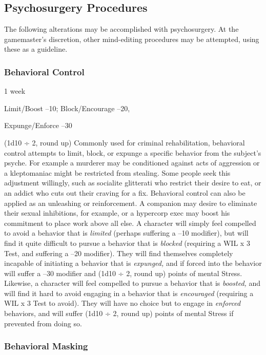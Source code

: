 \subsection{Psychosurgery Procedures}

The following alterations may be accomplished with 
psychosurgery. At the gamemaster's discretion, other 
mind-editing procedures may be attempted, using 
these as a guideline.

\subsubsection{Behavioral Control}


1 week

Limit/Boost –10; Block/Encourage –20, 

Expunge/Enforce –30

(1d10 ÷ 2, round up)
Commonly used for criminal rehabilitation, behavioral
control attempts to limit, block, or expunge a
specific behavior from the subject's psyche. For example
a murderer may be conditioned against acts of aggression
or a kleptomaniac might be restricted from
stealing. Some people seek this adjustment willingly, 
such as socialite glitterati who restrict their desire to 
eat, or an addict who cuts out their craving for a fix.
Behavioral control can also be applied as an unleashing
or reinforcement. A companion may desire
to eliminate their sexual inhibitions, for example, or 
a hypercorp exec may boost his commitment to place 
work above all else.
A character will simply feel compelled to avoid 
a behavior that is \textit{limited }(perhaps suffering a –10 
modifier), but will find it quite difficult to pursue a behavior
that is \textit{blocked }(requiring a WIL x 3 Test, and
suffering a –20 modifier). They will find themselves 
completely incapable of initiating a behavior that is 
\textit{expunged,} and if forced into the behavior will suffer 
a –30 modifier and (1d10 ÷ 2, round up) points of 
mental Stress.
Likewise, a character will feel compelled to pursue a 
behavior that is \textit{boosted,} and will find it hard to avoid 
engaging in a behavior that is \textit{encouraged }(requiring a 
WIL x 3 Test to avoid). They will have no choice but 
to engage in \textit{enforced }behaviors, and will suffer (1d10 
÷ 2, round up) points of mental Stress if prevented 
from doing so.

\subsubsection{Behavioral Masking}


